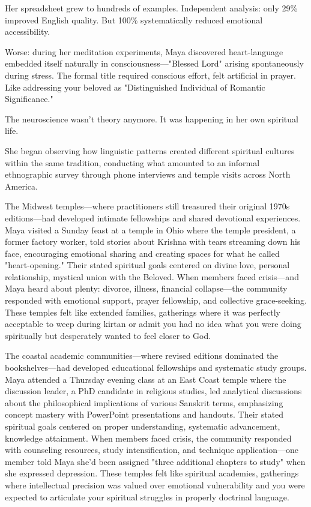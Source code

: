 \documentclass[12pt,twoside]{book}
\begin{document}
Her spreadsheet grew to hundreds of examples. Independent analysis: only 29\% improved English quality. But 100\% systematically reduced emotional accessibility.

Worse: during her meditation experiments, Maya discovered heart-language embedded itself naturally in consciousness—"Blessed Lord" arising spontaneously during stress. The formal title required conscious effort, felt artificial in prayer. Like addressing your beloved as "Distinguished Individual of Romantic Significance."

The neuroscience wasn't theory anymore. It was happening in her own spiritual life.

She began observing how linguistic patterns created different spiritual cultures within the same tradition, conducting what amounted to an informal ethnographic survey through phone interviews and temple visits across North America.

The Midwest temples—where practitioners still treasured their original 1970s editions—had developed intimate fellowships and shared devotional experiences. Maya visited a Sunday feast at a temple in Ohio where the temple president, a former factory worker, told stories about Krishna with tears streaming down his face, encouraging emotional sharing and creating spaces for what he called "heart-opening." Their stated spiritual goals centered on divine love, personal relationship, mystical union with the Beloved. When members faced crisis—and Maya heard about plenty: divorce, illness, financial collapse—the community responded with emotional support, prayer fellowship, and collective grace-seeking. These temples felt like extended families, gatherings where it was perfectly acceptable to weep during kirtan or admit you had no idea what you were doing spiritually but desperately wanted to feel closer to God.

The coastal academic communities—where revised editions dominated the bookshelves—had developed educational fellowships and systematic study groups. Maya attended a Thursday evening class at an East Coast temple where the discussion leader, a PhD candidate in religious studies, led analytical discussions about the philosophical implications of various Sanskrit terms, emphasizing concept mastery with PowerPoint presentations and handouts. Their stated spiritual goals centered on proper understanding, systematic advancement, knowledge attainment. When members faced crisis, the community responded with counseling resources, study intensification, and technique application—one member told Maya she'd been assigned "three additional chapters to study" when she expressed depression. These temples felt like spiritual academies, gatherings where intellectual precision was valued over emotional vulnerability and you were expected to articulate your spiritual struggles in properly doctrinal language.
\end{document}
